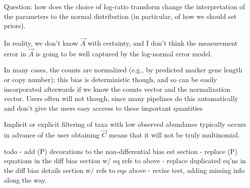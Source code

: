 Question: how does the choice of log-ratio transform change the interpretation
of the parameters to the normal distribution (in particular, of how we should
set priors).

In reality, we don't know $\vec A$ with certainty, and I don't think the
measurement error in $\vec A$ is going to be well captured by the log-normal
error model.

In many cases, the counts are normalized (e.g., by predicted marker gene length or copy
number); this bias is deterministic though, and so can be easily incorporated
afterwards if we know the counts vector and the normalization vector. Users
often will not though, since many pipelines do this automatically and don't
give the users easy acccess to these important quantities

Implicit or explicit filtering of taxa with low observed abundance typically
occurs in advance of the user obtaining $\vec C$ means that it will not be
truly multinomial.


todo
- add (P) decorations to the non-differential bias est section
- replace (P) equations in the diff bias section w/ eq refs to above
- replace duplicated eq'ns in the diff bias details section w/ refs to eqs
above
- revise test, adding missing info along the way.


